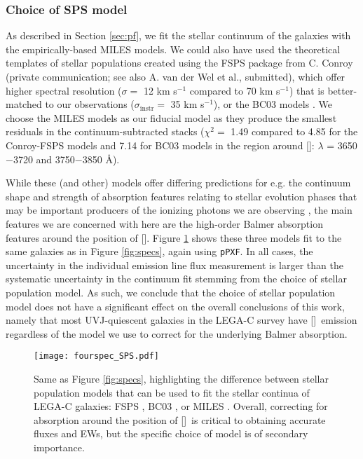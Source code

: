 \documentclass[twocolumn,natbib,iop,hyperref]{aastex62}
\newcommand{\oii}{[\ion{O}{2}]}
\begin{document}
\subsubsection{Choice of SPS model}
\label{sec:sps}
As described in Section \ref{sec:pf}, we fit the stellar continuum of the galaxies with the empirically-based MILES models.  We could also have used the theoretical templates of stellar populations created using the FSPS package \citep{2009ApJ...699..486C,2012ApJ...747...69C} from C. Conroy (private communication; see also A. van der Wel et al., submitted), which offer higher spectral resolution ($\sigma = $ 12 km s$^{-1}$ compared to 70 km s$^{-1}$) that is better-matched to our observations ($\sigma_{\mathrm{instr}} = $ 35 km s$^{-1}$), or the BC03 models \citep{2003MNRAS.344.1000B}.  We choose the MILES models as our fiducial model as they produce the smallest residuals in the continuum-subtracted stacks ($\chi^2 =$ 1.49 compared to 4.85 for the Conroy-FSPS models and 7.14 for BC03 models in the region around \oii: $\lambda$ = 3650$-$3720 and 3750$-$3850 \AA).

While these (and other) models offer differing predictions for e.g. the continuum shape and strength of absorption features relating to stellar evolution phases that may be important producers of the ionizing photons we are observing \cite[e.g. AGB stars;][]{2006ApJ...652...85M}, the main features we are concerned with here are the high-order Balmer absorption features around the position of \oii.  Figure \ref{fig:sps} shows these three models fit to the same galaxies as in Figure \ref{fig:specs}, again using \texttt{pPXF}.  In all cases, the uncertainty in the individual emission line flux measurement is larger than the systematic uncertainty in the continuum fit stemming from the choice of stellar population model.  As such, we conclude that the choice of stellar population model does not have a significant effect on the overall conclusions of this work, namely that most UVJ-quiescent galaxies in the LEGA-C survey have \oii\ emission regardless of the model we use to correct for the underlying Balmer absorption.

\begin{figure}
\begin{center}
\texttt{[image: fourspec\_SPS.pdf]}
\caption{Same as Figure \ref{fig:specs}, highlighting the difference between stellar population models that can be used to fit the stellar continua of LEGA-C galaxies: FSPS \citep{2009ApJ...699..486C,2012ApJ...747...69C}, BC03 \citep{2003MNRAS.344.1000B}, or MILES \cite[our default model;][]{2010MNRAS.404.1639V}.  Overall, correcting for absorption around the position of \oii\ is critical to obtaining accurate fluxes and EWs, but the specific choice of model is of secondary importance.}
\label{fig:sps}
\end{center}
\end{figure}
\end{document}

